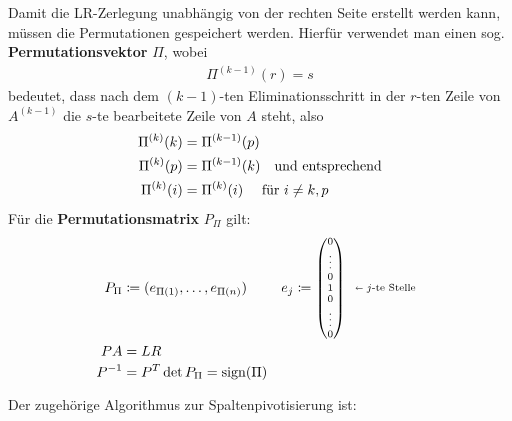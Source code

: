 Damit die LR-Zerlegung unabhängig von der rechten Seite erstellt werden kann, müssen die Permutationen gespeichert werden.
Hierfür verwendet man  einen sog. \textbf{Permutationsvektor} $\Pi$, wobei
\begin{gather*}
  \Pi^{(k-1)}(r) = s
\end{gather*}
bedeutet, dass nach dem $(k-1)$-ten Eliminationsschritt in der $r$-ten Zeile
von $A^{(k-1)}$ die $s$-te bearbeitete Zeile von $A$ steht, also
\begin{align*}
  \Pi^{(k)}(k) &= \Pi^{(k-1)}(p) \\
  \Pi^{(k)}(p) &= \Pi^{(k-1)}(k)  \quad \text{und entsprechend} \\
  \scriptsize \Pi^{(k)} (i) &= \Pi^{(k)} (i) \quad \text{ für }  i\neq k,p 
\end{align*}
Für die \textbf{Permutationsmatrix}
$P_{\Pi}$ gilt: 
\begin{align*}
  P_{\Pi}&\coloneqq (e_{\Pi(1)}, \ldots , e_{\Pi(n)}) 
  & e_j\coloneqq 
    {\scriptsize\begin{pmatrix}0\\\vdots\\0\\1\\0\\\vdots\\0\end{pmatrix}
  \begin{array}{l}\\\\\shortleftarrow \text{$j$-te Stelle}\\\\\\\end{array}}\\
  PA&= LR \\
  P^{-1} &= P^T
           \det P_{\Pi} = \operatorname{sign}(\Pi) 
\end{align*}


\label{2.2.3}
Der zugehörige Algorithmus zur Spaltenpivotisierung ist: \\

